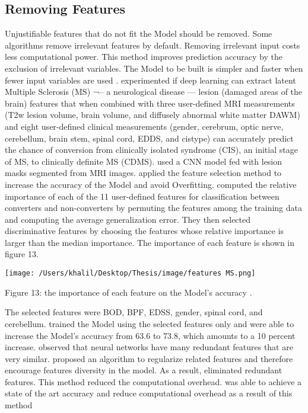 \documentclass[oneside,12pt,article]{article}
\begin{document}
\subsection{Removing Features}
Unjustifiable features that do not fit the Model should be removed. Some algorithms remove irrelevant features by default. Removing irrelevant input costs less computational power. This method improves prediction accuracy by the exclusion of irrelevant variables. The Model to be built is simpler and faster when fewer input variables are used \cite{reunanen2003overfitting}.\cite{yoo2019deep} experimented if deep learning can extract latent Multiple Sclerosis (MS) ¬– a neurological disease — lesion (damaged areas of the brain) features that when combined with three user-defined MRI measurements (T2w lesion volume, brain volume, and diffusely abnormal white matter DAWM) and eight user-defined clinical measurements (gender, cerebrum, optic nerve, cerebellum, brain stem, spinal cord, EDDS, and cistype) can accurately predict the chance of conversion from clinically isolated syndrome (CIS), an initial stage of MS, to clinically definite MS (CDMS). \cite{yoo2019deep} used a CNN model fed with lesion masks segmented from MRI images. \cite{yoo2019deep} applied the feature selection method to increase the accuracy of the Model and avoid Overfitting. \cite{yoo2019deep} computed the relative importance of each of the 11 user-defined features for classification between converters and non-converters by permuting the features among the training data and computing the average generalization error. They then selected discriminative features by choosing the features whose relative importance is larger than the median importance. The importance of each feature is shown in figure 13. 




\begin{center}
\texttt{[image: /Users/khalil/Desktop/Thesis/image/features MS.png]} 

Figure 13: the importance of each feature on the Model's accuracy \cite{yoo2019deep}.
\end{center}
The selected features were BOD, BPF, EDSS, gender, spinal cord, and cerebellum. \cite{yoo2019deep} trained the Model using the selected features only and were able to increase the Model's accuracy from 63.6 to 73.8, which amounts to a 10 percent increase. \cite{ayinde2019regularizing} observed that neural networks have many redundant features that are very similar. \cite{ayinde2019regularizing} proposed an algorithm to regularize related features and therefore encourage features diversity in the model. As a result, \cite{ayinde2019regularizing} eliminated redundant features. This method reduced the computational overhead. \cite{ayinde2019regularizing} was able to achieve a state of the art accuracy and reduce computational overhead as a result of this method
\end{document}
